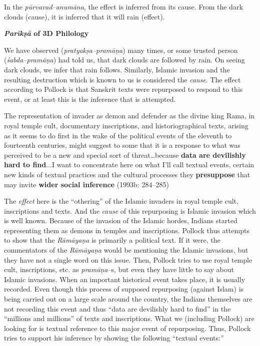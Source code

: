 In the \textit{pūrvavad–anumāna}, the effect is inferred from its cause. From the dark clouds (cause), it is inferred that it will rain (effect).

\textbf{\textit{Parīkṣā} of 3D Philology}

We have observed (\textit{pratyakṣa–pramāṇa}) many times, or some trusted person (\textit{śabda–pramāṇa}) had told us, that dark clouds are followed by rain. On seeing dark clouds, we infer that rain follows. Similarly, Islamic invasion and the resulting destruction which is known to us is considered the \textit{cause}. The effect according to Pollock is that Sanskrit texts were repurposed to respond to this event, or at least this is the inference that is attempted.

\begin{myquote}
The representation of invader as demon and defender as the divine king Rama, in royal temple cult, documentary inscriptions, and historiographical texts, arising as it seems to do first in the wake of the political events of the eleventh to fourteenth centuries, might suggest to some that it is a response to what was perceived to be a new and special sort of threat…because \textbf{data are devilishly hard to find}...I want to concentrate here on what I'll call textual events, certain new kinds of textual practices and the cultural processes they \textbf{presuppose} that may invite \textbf{wider social inference} (1993b: 284–285)
\end{myquote}

The \textit{effect} here is the “othering” of the Islamic invaders in royal temple cult, inscriptions and texts. And the \textit{cause} of this repurposing is Islamic invasion which is well known. Because of the invasion of the Islamic hordes, Indians started representing them as demons in temples and inscriptions. Pollock thus attempts to show that the \textit{Rāmāyaṇa} is primarily a political text. If it were, the commentators of the \textit{Rāmāyaṇa} would be mentioning the Islamic invasions, but they have not a single word on this issue. Then, Pollock tries to use royal temple cult, inscriptions, etc. as \textit{pramāṇa}–s, but even they have little to say about Islamic invasions. When an important historical event takes place, it is usually recorded. Even though this process of supposed repurposing (against Islam) is being carried out on a large scale around the country, the Indians themselves are not recording this event and thus “data are devilishly hard to find” in the “millions and millions” of texts and inscriptions. What we (including Pollock) are looking for is textual reference to this major event of repurposing. Thus, Pollock tries to support his inference by showing the following “textual events:”

